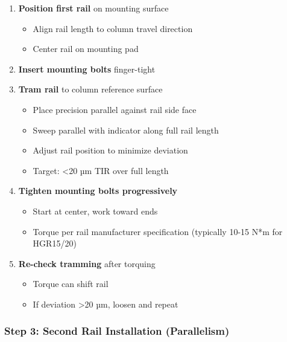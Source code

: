 \documentclass[
]{article}
\providecommand{\tightlist}{%
  \setlength{\itemsep}{0pt}\setlength{\parskip}{0pt}}
\begin{document}
\begin{enumerate}
\def\labelenumi{\arabic{enumi}.}
\tightlist
\item
  \textbf{Position first rail} on mounting surface

  \begin{itemize}
  \tightlist
  \item
    Align rail length to column travel direction
  \item
    Center rail on mounting pad
  \end{itemize}
\item
  \textbf{Insert mounting bolts} finger-tight
\item
  \textbf{Tram rail} to column reference surface

  \begin{itemize}
  \tightlist
  \item
    Place precision parallel against rail side face
  \item
    Sweep parallel with indicator along full rail length
  \item
    Adjust rail position to minimize deviation
  \item
    Target: \textless20 µm TIR over full length
  \end{itemize}
\item
  \textbf{Tighten mounting bolts progressively}

  \begin{itemize}
  \tightlist
  \item
    Start at center, work toward ends
  \item
    Torque per rail manufacturer specification (typically 10-15 N*m for
    HGR15/20)
  \end{itemize}
\item
  \textbf{Re-check tramming} after torquing

  \begin{itemize}
  \tightlist
  \item
    Torque can shift rail
  \item
    If deviation \textgreater20 µm, loosen and repeat
  \end{itemize}
\end{enumerate}

\subsubsection{Step 3: Second Rail Installation
(Parallelism)}\label{step-3-second-rail-installation-parallelism}
\end{document}
